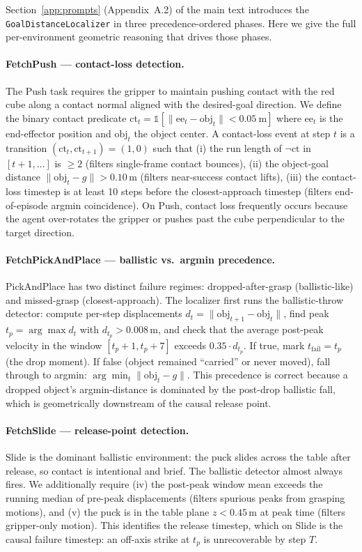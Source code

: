 Section~\ref{app:prompts} (Appendix~A.2) of the main text introduces the
\texttt{GoalDistanceLocalizer} in three precedence-ordered phases. Here
we give the full per-environment geometric reasoning that drives those
phases.

\paragraph{FetchPush --- contact-loss detection.}
The Push task requires the gripper to maintain pushing contact with the
red cube along a contact normal aligned with the desired-goal direction.
We define the binary contact predicate
$\mathrm{ct}_t = \mathbb{1}[\|\text{ee}_t - \text{obj}_t\| < 0.05~\mathrm{m}]$
where $\text{ee}_t$ is the end-effector position and $\text{obj}_t$ the
object center. A contact-loss event at step $t$ is a transition
$(\mathrm{ct}_t,\mathrm{ct}_{t+1})=(1,0)$ such that
(i) the run length of $\neg \mathrm{ct}$ in $[t\!+\!1,\dots]$ is $\ge 2$
(filters single-frame contact bounces),
(ii) the object-goal distance $\|\text{obj}_t - g\| > 0.10$\,m
(filters near-success contact lifts),
(iii) the contact-loss timestep is at least 10 steps before the closest-approach
timestep (filters end-of-episode argmin coincidence).
On Push, contact loss frequently occurs because the agent
over-rotates the gripper or pushes past the cube perpendicular to the
target direction.

\paragraph{FetchPickAndPlace --- ballistic vs.\ argmin precedence.}
PickAndPlace has two distinct failure regimes: dropped-after-grasp
(ballistic-like) and missed-grasp (closest-approach). The localizer first
runs the ballistic-throw detector: compute per-step displacements
$d_t = \|\text{obj}_{t+1} - \text{obj}_t\|$, find peak $t_p\!=\!\arg\max d_t$
with $d_{t_p} > 0.008$\,m, and check that the average post-peak velocity
in the window $[t_p\!+\!1, t_p\!+\!7]$ exceeds $0.35\cdot d_{t_p}$. If
true, mark $t_{\text{fail}}\!=\!t_p$ (the drop moment). If false (object
remained ``carried'' or never moved), fall through to argmin: $\arg\min_t
\|\text{obj}_t - g\|$. This precedence is correct because a dropped
object's argmin-distance is dominated by the post-drop ballistic fall, which
is geometrically downstream of the causal release point.

\paragraph{FetchSlide --- release-point detection.}
Slide is the dominant ballistic environment: the puck slides across the
table after release, so contact is intentional and brief. The ballistic
detector almost always fires. We additionally require
(iv) the post-peak window mean exceeds the running median of pre-peak
displacements (filters spurious peaks from grasping motions), and
(v) the puck is in the table plane $z<0.45$\,m at peak time (filters
gripper-only motion). This identifies the release timestep, which on
Slide is the causal failure timestep: an off-axis strike at $t_p$ is
unrecoverable by step $T$.

